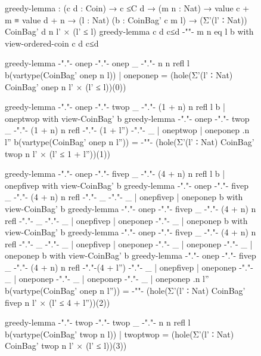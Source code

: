 \begin{figure}
\codefigure
\begin{code}
greedy-lemma :  (c d : Coin) → c ≤C d → (m n : Nat) → value c + m ≡ value d + n →
                (l : Nat) (b : CoinBag' c m l) → (Σ'(l' ∶ Nat)) CoinBag' d n l' × (l' ≤ l)
greedy-lemma          c               d      c≤d  {-""-}   m                n        eq             l                   b  with view-ordered-coin c d c≤d

greedy-lemma {-"."-}  onep   {-"."-}  onep   _    {-"."-}  n                n        refl           l                   b(vartype(CoinBag' onep n l))  | oneponep = (hole(Σ'(l' ∶ Nat) CoinBag' onep n l' × (l' ≤ l))(0))

greedy-lemma {-"."-}  onep   {-"."-}  twop   _    {-"."-}  (1 + n)          n        refl           l                   b  | oneptwop   with view-CoinBag' b
greedy-lemma {-"."-}  onep   {-"."-}  twop   _    {-"."-}  (1 + n)          n        refl  {-"."-}  (1 + l'')  {-"."-}  _  | oneptwop   | oneponep {.n} {l''} b(vartype(CoinBag' onep n l'')) =
{-"\hfill"-} (hole(Σ'(l' ∶ Nat) CoinBag' twop n l' × (l' ≤ 1 + l''))(1))

greedy-lemma {-"."-}  onep   {-"."-}  fivep  _    {-"."-}  (4 + n)          n        refl           l                   b  | onepfivep  with view-CoinBag' b
greedy-lemma {-"."-}  onep   {-"."-}  fivep  _    {-"."-}  (4 + n)          n        refl  {-"."-}  _          {-"."-}  _  | onepfivep  | oneponep          b  with view-CoinBag' b
greedy-lemma {-"."-}  onep   {-"."-}  fivep  _    {-"."-}  (4 + n)          n        refl  {-"."-}  _          {-"."-}  _  | onepfivep  | oneponep {-"."-}  _  | oneponep          b  with view-CoinBag' b
greedy-lemma {-"."-}  onep   {-"."-}  fivep  _    {-"."-}  (4 + n)          n        refl  {-"."-}  _          {-"."-}  _  | onepfivep  | oneponep {-"."-}  _  | oneponep {-"."-}  _  | oneponep          b  with view-CoinBag' b
greedy-lemma {-"."-}  onep   {-"."-}  fivep  _    {-"."-}  (4 + n)          n        refl  {-"."-}(4 + l'')    {-"."-}  _  | onepfivep  | oneponep {-"."-}  _  | oneponep {-"."-}  _  | oneponep {-"."-}  _  | oneponep {.n} {l''} b(vartype(CoinBag' onep n l'')) =
{-"\hfill"-} (hole(Σ'(l' ∶ Nat) CoinBag' fivep n l' × (l' ≤ 4 + l''))(2))

greedy-lemma {-"."-}  twop   {-"."-}  twop   _    {-"."-}  n                n        refl           l                   b(vartype(CoinBag' twop n l))  | twoptwop = (hole(Σ'(l' ∶ Nat) CoinBag' twop n l' × (l' ≤ l))(3))


\end{code}
\end{figure}
